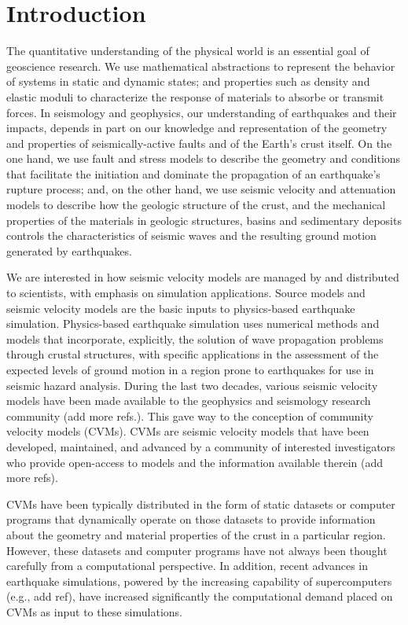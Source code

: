 
\section{Introduction}
\label{sec:introduction}

The quantitative understanding of the physical world is an essential goal of geoscience research. We use mathematical abstractions to represent the behavior of systems in static and dynamic states; and properties such as density and elastic moduli to characterize the response of materials to absorbe or transmit forces. In seismology and geophysics, our understanding of earthquakes and their impacts, depends in part on our knowledge and representation of the geometry and properties of seismically-active faults and of the Earth's crust itself. On the one hand, we use fault and stress models to describe the geometry and conditions that facilitate the initiation and dominate the propagation of an earthquake's rupture process; and, on the other hand, we use seismic velocity and attenuation models to describe how the geologic structure of the crust, and the mechanical properties of the materials in geologic structures, basins and sedimentary deposits controls the characteristics of seismic waves and the resulting ground motion generated by earthquakes.

We are interested in how seismic velocity models are managed by and distributed to scientists, with emphasis on simulation applications. Source models and seismic velocity models are the basic inputs to physics-based earthquake simulation. Physics-based earthquake simulation uses numerical methods and models that incorporate, explicitly, the solution of wave propagation problems through crustal structures, with specific applications in the assessment of the expected levels of ground motion in a region prone to earthquakes for use in seismic hazard analysis. During the last two decades, various seismic velocity models have been made available to the geophysics and seismology research community \citep[e.g.,][]{Brocher_2008_BSSA} (add more refs.). This gave way to the conception of community velocity models (CVMs). CVMs are seismic velocity models that have been developed, maintained, and advanced by a community of interested investigators who provide open-access to models and the information available therein \citep[e.g.,][]{Magistrale_2000_BSSA} (add more refs). 

CVMs have been typically distributed in the form of static datasets or computer programs that dynamically operate on those datasets to provide information about the geometry and material properties of the crust in a particular region. However, these datasets and computer programs have not always been thought carefully from a computational perspective. In addition, recent advances in earthquake simulations, powered by the increasing capability of supercomputers (e.g., add ref), have increased significantly the computational demand placed on CVMs as input to these simulations. 


